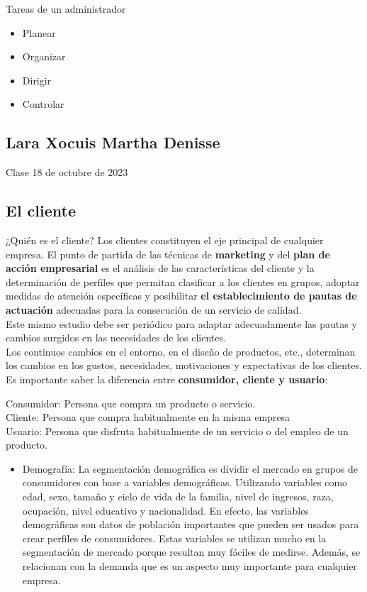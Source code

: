 \documentclass[letterpaper,12pt]{article}
\begin{document}
\begin{sloppypar}
Tareas de un administrador
\begin{itemize}
    \item Planear 
    \item Organizar 
    \item Dirigir 
    \item Controlar
\end{itemize}
\newpage
\subsection*{Lara Xocuis Martha Denisse}
Clase 18 de octubre de 2023
\textcolor[rgb]{0.5,0.5,0.3}{\section*{El cliente}}

¿Quién es el cliente?
Los clientes constituyen el eje principal de cualquier empresa. El punto de partida de las técnicas de \textbf{marketing} y del \textbf{plan de acción empresarial} es el análisis de las características del cliente y la determinación de perfiles que permitan clasificar a los clientes en grupos, adoptar medidas de atención específicas y posibilitar \textbf{el establecimiento de pautas de actuación} adecuadas para la consecución de un servicio de calidad.
\vspace{0.3cm}\\
Este mismo estudio debe ser periódico para adaptar adecuadamente las pautas y cambios surgidos en las necesidades de los clientes.
\vspace{0.3cm}\\
Los continuos cambios en el entorno, en el diseño de productos, etc., determinan los cambios en los gustos, necesidades, motivaciones y expectativas de los clientes.
\vspace{0.3cm}\\
Es importante saber la diferencia entre \textbf{consumidor, cliente y usuario}: 
\begin{center}
    Consumidor: Persona que compra un producto o servicio.\\
    Cliente: Persona que compra habitualmente en la misma empresa\\
    Usuario: Persona que disfruta habitualmente de un servicio o del empleo de un producto.
\end{center}
\begin{itemize}
    \item Demografía: La segmentación demográfica es dividir el mercado en grupos de consumidores con base a variables demográficas. Utilizando variables como edad, sexo, tamaño y ciclo de vida de la familia, nivel de ingresos, raza, ocupación, nivel educativo y nacionalidad.
    En efecto, las variables demográficas son datos de población importantes que pueden ser usados para crear perfiles de consumidores. Estas variables se utilizan mucho en la segmentación de mercado porque resultan muy fáciles de medirse. Además, se relacionan con la demanda que es un aspecto muy importante para cualquier empresa.


\end{itemize}
\end{sloppypar}
\end{document}
